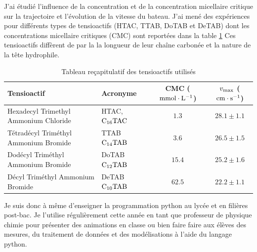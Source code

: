 \documentclass[french, 10pt]{article}
\begin{document}
 J'ai étudié l'influence de la concentration et de la concentration micellaire critique sur la trajectoire et l'évolution de la vitesse du bateau. J'ai mené des expériences pour différents types de tensioactifs (HTAC, TTAB, DoTAB et DeTAB) dont les concentrations micellaire critiques (CMC) sont reportées dans la table \ref{Table:Tablev0} Ces tensioactifs diffèrent de par la la longueur de leur chaîne carbonée et la nature de la tête hydrophile.
 
 \begin{table}[!ht]
  \centering
  \begin{tabular}{llcc}
    \hline \hline
    Tensioactif & Acronyme & CMC ($\rm mmol\cdot L^{-1}$) & $v_{\rm max}$ ($\rm cm\cdot s^{-1}$)\\ \hline \hline
    Hexadecyl Trimethyl Ammonium Chloride &HTAC, $\rm C_{16}TAC$& $1.3$ & $28.1\pm 1.1$ \\
    Tétradécyl Triméthyl Ammonium Bromide &TTAB $\rm C_{14}TAB$ & $3.6$ & $26.5\pm 1.5$\\
    Dodécyl Triméthyl Ammonium Bromide &DoTAB $\rm C_{12}TAB$ & $15.4$ &  $25.2 \pm 1.6$ \\
    Décyl Triméthyl Ammonium Bromide & DeTAB $\rm C_{10}TAB$ & $62.5$ & $22.2\pm 1.1$\\ \hline \hline 
  \end{tabular}
  \caption{Tableau reçapitulatif des tensioactifs utilisés}
  \label{Table:Tablev0}
\end{table}


Je suis donc à même d'enseigner la programmation python au lycée et en filières post-bac. Je l'utilise régulièrement cette année en tant que professeur de physique chimie pour présenter des animations en classe ou bien faire faire aux élèves des mesures, du traitement de données et des modélisations à l'aide du langage python. 

% 
% 
\end{document}

